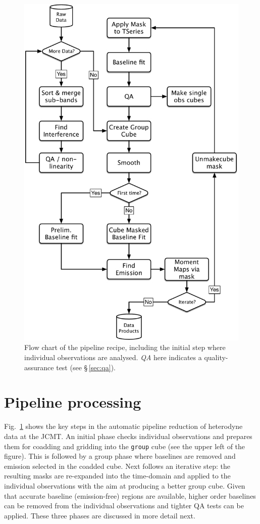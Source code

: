 \documentclass[a4paper,fleqn,usenatbib]{mnras}
\begin{document}
\begin{figure}
\includegraphics[width=\columnwidth]{flowchart}
\caption{Flow chart of the pipeline recipe, including the initial step
  where individual observations are analysed. \emph{QA} here indicates
  a quality-assurance test (see \S\,\ref{sec:qa}).
}
\label{fig:flowchart}
\end{figure}

\section{Pipeline processing}

Fig.~\ref{fig:flowchart} shows the key steps in the automatic
pipeline reduction of heterodyne data at the JCMT. An initial phase
checks individual observations and prepares them for coadding and
gridding into the \texttt{group} cube (see the upper left of the figure).
This is followed by a group
phase where baselines are removed and emission selected in the coadded
cube.  Next follows an iterative step: the resulting masks are
re-expanded into the time-domain and applied to the individual
observations with the aim at producing a better group cube. Given that
accurate baseline (emission-free) regions are available, higher
order baselines can be removed from the individual observations and
tighter QA tests can be applied. These three phases are discussed in
more detail next.
\end{document}
